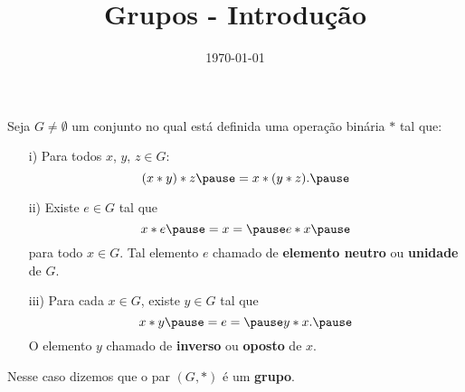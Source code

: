 \documentclass{beamer}
\title{Grupos - Introdu\c{c}\~ao}
\author[\autor]{\autor}
\institute[\instituto]{\instituto}
\date{\today}
\begin{document}
    \begin{frame}
        \maketitle
    \end{frame}


    \begin{frame}
        \begin{definicao}
            Seja $G \ne \emptyset$ \pause um conjunto no qual est\'a definida uma opera{\c c}{\~a}o bin{\'a}ria $*$ \pause tal que:\pause
            \begin{enumerate}
                \item[i)] Para todos $x$, $y$, $z\in G$:\pause
                \[
                    (x*y)*z \pause = x*(y*z).\pause
                \]
                
                \item[ii)] Existe $e \in G$ \pause tal que\pause
                \[
                    x*e \pause = x = \pause e*x\pause
                \]
                para todo $x \in G$. \pause Tal elemento $e$  chamado de \textbf{elemento neutro} \pause ou \textbf{unidade} \pause de $G$.\pause

            \end{enumerate}
        \end{definicao}
    \end{frame}

    \begin{frame}
        \begin{definicao}
            \begin{enumerate}
                \item[iii)] Para cada $x \in G$, \pause existe $y \in G$ \pause tal que\pause
                \[
                    x*y \pause = e = \pause y*x.\pause
                \]
                O elemento $y$  chamado de \textbf{inverso} \pause ou \textbf{oposto} \pause de $x$.\pause
            \end{enumerate}
            Nesse caso dizemos que o par $(G, *)$ \pause \'e um \textbf{grupo}.\pause
        \end{definicao}
    \end{frame}
\end{document}
